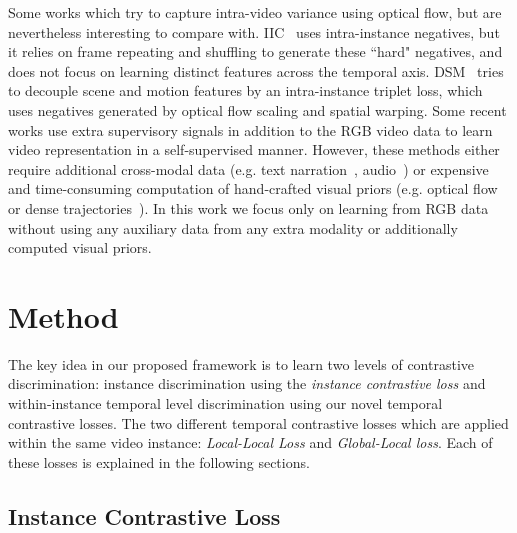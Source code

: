 \documentclass[10pt,twocolumn,letterpaper]{article}
\begin{document}
Some works which try to capture intra-video variance using optical flow, but are nevertheless interesting to compare with. IIC~\cite{iic} uses intra-instance negatives, but it relies on frame repeating and shuffling to generate these ``hard" negatives, and does not focus on learning distinct features across the temporal axis. DSM~\cite{scene-motion} tries to decouple scene and motion features by an intra-instance triplet loss, which uses negatives generated by optical flow scaling and spatial warping. Some recent works use extra supervisory signals in addition to the RGB video data to learn video representation in a self-supervised manner. However, these methods either require additional cross-modal data (e.g. text narration~\cite{miech2020end}, audio~\cite{afouras2020self}) or expensive and time-consuming computation of hand-crafted visual priors (e.g. optical flow~\cite{iic,cbt,aot,local_motion_cues,cotraining} or dense trajectories~\cite{idt}). In this work we focus only on learning from RGB data without using any auxiliary data from any extra modality or additionally computed visual priors. 

\section{Method}
\vspace{-2mm}

The key idea in our proposed framework is to learn two levels of contrastive discrimination: instance discrimination using the {\em instance contrastive loss} and within-instance temporal level discrimination using our novel temporal contrastive losses. The two different temporal contrastive losses which are applied within the same video instance: {\em Local-Local Loss} and {\em Global-Local loss}. Each of these losses is explained in the following sections.

\subsection{Instance Contrastive Loss}
\end{document}
